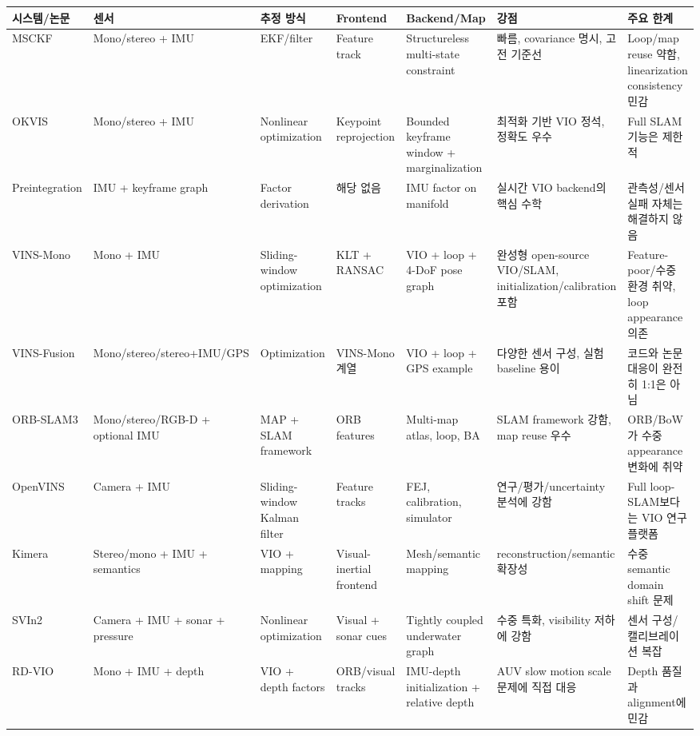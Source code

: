 \documentclass[11pt,a4paper]{article}
\begin{document}
\begin{landscape}
\begin{table}[p]
\centering
\small
\begin{tabularx}{\linewidth}{p{27mm}p{24mm}p{25mm}p{30mm}p{34mm}p{39mm}Y}
\toprule
\textbf{시스템/논문} & \textbf{센서} & \textbf{추정 방식} & \textbf{Frontend} & \textbf{Backend/Map} & \textbf{강점} & \textbf{주요 한계} \\
\midrule
MSCKF & Mono/stereo + IMU & EKF/filter & Feature track & Structureless multi-state constraint & 빠름, covariance 명시, 고전 기준선 & Loop/map reuse 약함, linearization consistency 민감 \\
OKVIS & Mono/stereo + IMU & Nonlinear optimization & Keypoint reprojection & Bounded keyframe window + marginalization & 최적화 기반 VIO 정석, 정확도 우수 & Full SLAM 기능은 제한적 \\
Preintegration & IMU + keyframe graph & Factor derivation & 해당 없음 & IMU factor on manifold & 실시간 VIO backend의 핵심 수학 & 관측성/센서 실패 자체는 해결하지 않음 \\
VINS-Mono & Mono + IMU & Sliding-window optimization & KLT + RANSAC & VIO + loop + 4-DoF pose graph & 완성형 open-source VIO/SLAM, initialization/calibration 포함 & Feature-poor/수중 환경 취약, loop appearance 의존 \\
VINS-Fusion & Mono/stereo/stereo+IMU/GPS & Optimization & VINS-Mono 계열 & VIO + loop + GPS example & 다양한 센서 구성, 실험 baseline 용이 & 코드와 논문 대응이 완전히 1:1은 아님 \\
ORB-SLAM3 & Mono/stereo/RGB-D + optional IMU & MAP + SLAM framework & ORB features & Multi-map atlas, loop, BA & SLAM framework 강함, map reuse 우수 & ORB/BoW가 수중 appearance 변화에 취약 \\
OpenVINS & Camera + IMU & Sliding-window Kalman filter & Feature tracks & FEJ, calibration, simulator & 연구/평가/uncertainty 분석에 강함 & Full loop-SLAM보다는 VIO 연구 플랫폼 \\
Kimera & Stereo/mono + IMU + semantics & VIO + mapping & Visual-inertial frontend & Mesh/semantic mapping & reconstruction/semantic 확장성 & 수중 semantic domain shift 문제 \\
SVIn2 & Camera + IMU + sonar + pressure & Nonlinear optimization & Visual + sonar cues & Tightly coupled underwater graph & 수중 특화, visibility 저하에 강함 & 센서 구성/캘리브레이션 복잡 \\
RD-VIO & Mono + IMU + depth & VIO + depth factors & ORB/visual tracks & IMU-depth initialization + relative depth & AUV slow motion scale 문제에 직접 대응 & Depth 품질과 alignment에 민감 \\

\end{tabularx}
\end{table}
\end{landscape}
\end{document}
